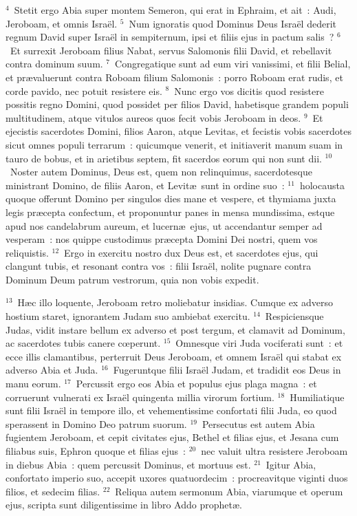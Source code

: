 ${}^{4}$~Stetit ergo Abia super montem Semeron, qui erat in Ephraim, et ait~: Audi, Jeroboam, et omnis Isra\"el.
${}^{5}$~Num ignoratis quod Dominus Deus Isra\"el dederit regnum David super Isra\"el in sempiternum, ipsi et filiis ejus in pactum salis~?
${}^{6}$~Et surrexit Jeroboam filius Nabat, servus Salomonis filii David, et rebellavit contra dominum suum.
${}^{7}$~Congregatique sunt ad eum viri vanissimi, et filii Belial, et pr\ae valuerunt contra Roboam filium Salomonis~: porro Roboam erat rudis, et corde pavido, nec potuit resistere eis.
${}^{8}$~Nunc ergo vos dicitis quod resistere possitis regno Domini, quod possidet per filios David, habetisque grandem populi multitudinem, atque vitulos aureos quos fecit vobis Jeroboam in deos.
${}^{9}$~Et ejecistis sacerdotes Domini, filios Aaron, atque Levitas, et fecistis vobis sacerdotes sicut omnes populi terrarum~: quicumque venerit, et initiaverit manum suam in tauro de bobus, et in arietibus septem, fit sacerdos eorum qui non sunt dii.
${}^{10}$~Noster autem Dominus, Deus est, quem non relinquimus, sacerdotesque ministrant Domino, de filiis Aaron, et Levit\ae\ sunt in ordine suo~:
${}^{11}$~holocausta quoque offerunt Domino per singulos dies mane et vespere, et thymiama juxta legis pr\ae cepta confectum, et proponuntur panes in mensa mundissima, estque apud nos candelabrum aureum, et lucern\ae\ ejus, ut accendantur semper ad vesperam~: nos quippe custodimus pr\ae cepta Domini Dei nostri, quem vos reliquistis.
${}^{12}$~Ergo in exercitu nostro dux Deus est, et sacerdotes ejus, qui clangunt tubis, et resonant contra vos~: filii Isra\"el, nolite pugnare contra Dominum Deum patrum vestrorum, quia non vobis expedit.


${}^{13}$~H\ae c illo loquente, Jeroboam retro moliebatur insidias. Cumque ex adverso hostium staret, ignorantem Judam suo ambiebat exercitu.
${}^{14}$~Respiciensque Judas, vidit instare bellum ex adverso et post tergum, et clamavit ad Dominum, ac sacerdotes tubis canere cœperunt.
${}^{15}$~Omnesque viri Juda vociferati sunt~: et ecce illis clamantibus, perterruit Deus Jeroboam, et omnem Isra\"el qui stabat ex adverso Abia et Juda.
${}^{16}$~Fugeruntque filii Isra\"el Judam, et tradidit eos Deus in manu eorum.
${}^{17}$~Percussit ergo eos Abia et populus ejus plaga magna~: et corruerunt vulnerati ex Isra\"el quingenta millia virorum fortium.
${}^{18}$~Humiliatique sunt filii Isra\"el in tempore illo, et vehementissime confortati filii Juda, eo quod sperassent in Domino Deo patrum suorum.
${}^{19}$~Persecutus est autem Abia fugientem Jeroboam, et cepit civitates ejus, Bethel et filias ejus, et Jesana cum filiabus suis, Ephron quoque et filias ejus~:
${}^{20}$~nec valuit ultra resistere Jeroboam in diebus Abia~: quem percussit Dominus, et mortuus est.
${}^{21}$~Igitur Abia, confortato imperio suo, accepit uxores quatuordecim~: procreavitque viginti duos filios, et sedecim filias.
${}^{22}$~Reliqua autem sermonum Abia, viarumque et operum ejus, scripta sunt diligentissime in libro Addo prophet\ae .


